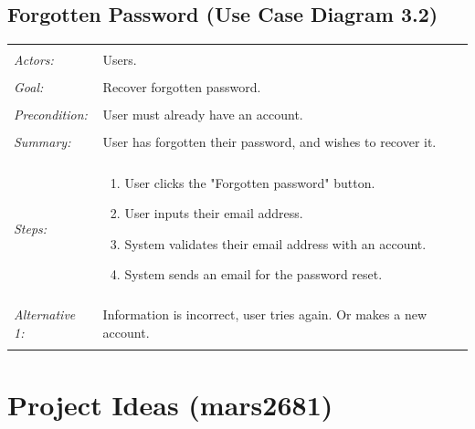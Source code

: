 \documentclass[11pt]{report}
\begin{document}
\subsection{Forgotten Password (Use Case Diagram 3.2)}
\begin{tabular}{ p{2cm} p{12cm} }
 \hline
 \\
 \textit{Actors:} & Users. \\ 
  \\
 \textit{Goal:} & Recover forgotten password. \\ 
 \\
 \textit{Precondition:} & User must already have an account. \\
 \\
 \textit{Summary:}  & User has forgotten their password, and wishes to recover it. \\
 \\
 \textit{Steps:} & \begin{enumerate}
 \item User clicks the "Forgotten password" button. 
 \item User inputs their email address. 
 \item System validates their email address with an account. 
 \item System sends an email for the password reset. 
 \end{enumerate} \\
\\
  \textit{Alternative 1:} & Information is incorrect, user tries again. Or makes a new account. \\
\\
\hline
\end{tabular}

\section{Project Ideas (mars2681)}
\end{document}
